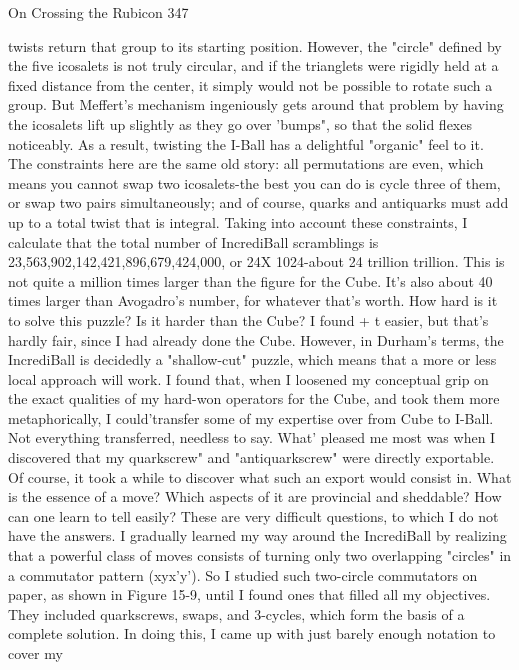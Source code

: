 On Crossing the Rubicon                                                               347

twists return that group to its starting position. However, the "circle" defined by the
five icosalets is not truly circular, and if the trianglets were rigidly held at a fixed
distance from the center, it simply would not be possible to rotate such a group.
But Meffert's mechanism ingeniously gets around that problem by having the
icosalets lift up slightly as they go over 'bumps", so that the solid flexes noticeably.
As a result, twisting the I-Ball has a delightful "organic" feel to it.
         The constraints here are the same old story: all permutations are even,
which means you cannot swap two icosalets-the best you can do is cycle three of
them, or swap two pairs simultaneously; and of course, quarks and antiquarks must
add up to a total twist that is integral. Taking into account these constraints, I
calculate that the total number of IncrediBall scramblings is
23,563,902,142,421,896,679,424,000, or 24X 1024-about 24 trillion trillion. This
is not quite a million times larger than the figure for the Cube. It's also about 40
times larger than Avogadro's number, for whatever that's worth.
         How hard is it to solve this puzzle? Is it harder than the Cube? I found + t
easier, but that's hardly fair, since I had already done the Cube. However, in
Durham's terms, the IncrediBall is decidedly a "shallow-cut" puzzle, which means
that a more or less local approach will work. I found that, when I loosened my
conceptual grip on the exact qualities of my hard-won operators for the Cube, and
took them more metaphorically, I could'transfer some of my expertise over from
Cube to I-Ball. Not everything transferred, needless to say. What' pleased me most
was when I discovered that my quarkscrew" and "antiquarkscrew" were directly
exportable. Of course, it took a while to discover what such an export would
consist in. What is the essence of a move? Which aspects of it are provincial and
sheddable? How can one learn to tell easily? These are very difficult questions, to
which I do not have the answers.
         I gradually learned my way around the IncrediBall by realizing that a
powerful class of moves consists of turning only two overlapping "circles" in a
commutator pattern (xyx'y'). So I studied such two-circle commutators on paper, as
shown in Figure 15-9, until I found ones that filled all my objectives. They
included quarkscrews, swaps, and 3-cycles, which form the basis of a complete
solution. In doing this, I came up with just barely enough notation to cover my
